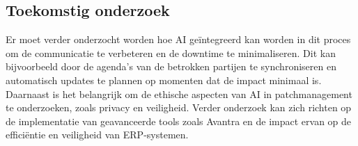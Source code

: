 \documentclass[a0,portrait]{hogent-poster}
\begin{document}
\begin{multicols}{2}
\section{Toekomstig onderzoek}
Er moet verder onderzocht worden hoe AI geïntegreerd kan worden in dit proces om de communicatie te verbeteren en de downtime te minimaliseren. Dit kan bijvoorbeeld door de agenda's van de betrokken partijen te synchroniseren en automatisch updates te plannen op momenten dat de impact minimaal is. Daarnaast is het belangrijk om de ethische aspecten van AI in patchmanagement te onderzoeken, zoals privacy en veiligheid. Verder onderzoek kan zich richten op de implementatie van geavanceerde tools zoals Avantra en de impact ervan op de efficiëntie en veiligheid van ERP-systemen.


\end{multicols}
\end{document}
